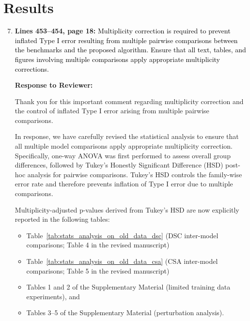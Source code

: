 \documentclass[12pt,letterpaper]{article}
\begin{document}
\section*{Results}

\begin{enumerate}
    \setcounter{enumi}{6}
    
    \item \textbf{Lines 453--454, page 18:} \textcolor{black}{Multiplicity correction is required to prevent inflated Type I error resulting from multiple pairwise comparisons between the benchmarks and the proposed algorithm. Ensure that all text, tables, and figures involving multiple comparisons apply appropriate multiplicity corrections.}







\textbf{Response to Reviewer:}

Thank you for this important comment regarding multiplicity correction and the control of inflated Type I error arising from multiple pairwise comparisons.

In response, we have carefully revised the statistical analysis to ensure that all multiple model comparisons apply appropriate multiplicity correction. Specifically, one-way ANOVA was first performed to assess overall group differences, followed by Tukey’s Honestly Significant Difference (HSD) post-hoc analysis for pairwise comparisons. Tukey’s HSD controls the family-wise error rate and therefore prevents inflation of Type I error due to multiple comparisons.

Multiplicity-adjusted p-values derived from Tukey’s HSD are now explicitly reported in the following tables:

\begin{itemize}

    \item Table~\ref{tab:stats_analysis_on_old_data_dsc} (DSC inter-model comparisons; Table 4 in the revised manuscript)
    \item Table~\ref{tab:stats_analysis_on_old_data_csa} (CSA inter-model comparisons; Table 5 in the revised manuscript)

    \item Tables 1 and 2 of the Supplementary Material (limited training data experiments), and
    \item Tables 3–5 of the Supplementary Material (perturbation analysis).

\end{itemize}


\end{enumerate}
\end{document}
